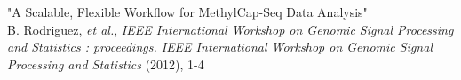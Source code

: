 "A Scalable, Flexible Workflow for MethylCap-Seq Data Analysis" \\
\small{B. Rodriguez, \textit{et al.}, \textit{IEEE International Workshop on Genomic Signal Processing and Statistics : proceedings. IEEE International Workshop on Genomic Signal Processing and Statistics} (2012), 1-4} \\
